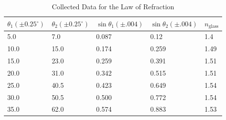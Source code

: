 \documentclass[twocolumn,english]{IEEEtran}
\theoremstyle{plain}
\theoremstyle{plain}
\begin{document}
\begin{centering}
\begin{table}[!H]
	\centering{}
	\caption{Collected Data for the Law of Refraction}
\begin{tabular}{|l|l|l|l|l|}
\hline
\multicolumn{1}{|c}{\textbf{$\theta_1 (\pm0.25^{\circ})$}} & \multicolumn{1}{|c}{\textbf{$\theta_2 (\pm0.25^{\circ})$}} & \multicolumn{1}{|c}{\textbf{$\sin\theta_1(\pm.004)$}} & \multicolumn{1}{|c}{\textbf{$\sin\theta_2 (\pm.004)$}} & \multicolumn{1}{|c|}{$n_{\text{glass}}$} \\ \hline
5.0                                                   & 7.0                                                   & 0.087                                      & 0.12                                      & 1.4                                    	\\ \hline
10.0                                                  & 15.0                                                  & 0.174                                      & 0.259                                      & 1.49                                    	\\ \hline
15.0                                                  & 23.0                                                  & 0.259                                      & 0.391                                      & 1.51                                   	\\ \hline
20.0                                                  & 31.0                                                  & 0.342                                      & 0.515                                      & 1.51                                    	\\ \hline
25.0                                                  & 40.5                                                & 0.423                                      & 0.649                                      & 1.54                                    	\\ \hline
30.0                                                  & 50.5                                                & 0.500                                      & 0.772                                      & 1.54                                    	\\ \hline
35.0                                                  & 62.0                                                  & 0.574                                      & 0.883                                      & 1.53                                    	\\ \hline
\end{tabular}
\end{table}


\end{centering}
\end{document}
